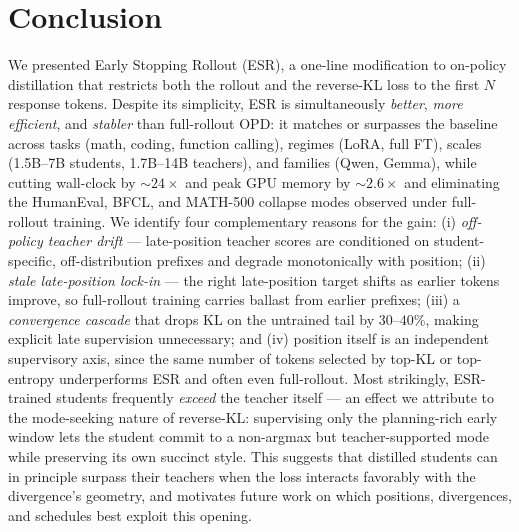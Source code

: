 \documentclass{article}
\newcommand{\method}{ESR}
\newcommand{\methodfull}{Early Stopping Rollout}
\begin{document}



\section{Conclusion}
\label{sec:conclusion}

We presented \methodfull{} (\method{}), a one-line modification to on-policy distillation that restricts both the rollout and the reverse-KL loss to the first $N$ response tokens. Despite its simplicity, \method{} is simultaneously \emph{better}, \emph{more efficient}, and \emph{stabler} than full-rollout OPD: it matches or surpasses the baseline across tasks (math, coding, function calling), regimes (LoRA, full FT), scales (1.5B--7B students, 1.7B--14B teachers), and families (Qwen, Gemma), while cutting wall-clock by ${\sim}24\times$ and peak GPU memory by ${\sim}2.6\times$ and eliminating the HumanEval, BFCL, and MATH-500 collapse modes observed under full-rollout training. We identify four complementary reasons for the gain: (i) \emph{off-policy teacher drift} --- late-position teacher scores are conditioned on student-specific, off-distribution prefixes and degrade monotonically with position; (ii) \emph{stale late-position lock-in} --- the right late-position target shifts as earlier tokens improve, so full-rollout training carries ballast from earlier prefixes; (iii) a \emph{convergence cascade} that drops KL on the untrained tail by $30$--$40\%$, making explicit late supervision unnecessary; and (iv) position itself is an independent supervisory axis, since the same number of tokens selected by top-KL or top-entropy underperforms \method{} and often even full-rollout. Most strikingly, \method-trained students frequently \emph{exceed} the teacher itself --- an effect we attribute to the mode-seeking nature of reverse-KL: supervising only the planning-rich early window lets the student commit to a non-argmax but teacher-supported mode while preserving its own succinct style. This suggests that distilled students can in principle surpass their teachers when the loss interacts favorably with the divergence's geometry, and motivates future work on which positions, divergences, and schedules best exploit this opening.
\end{document}
